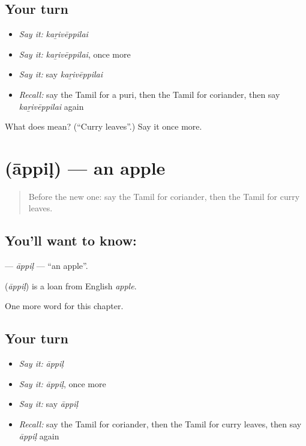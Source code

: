 \subsection*{Your turn}
\begin{itemize}
\raggedright
  \item \emph{Say it:} \emph{kaṟivēppilai}
  \item \emph{Say it:} \emph{kaṟivēppilai}, once more
  \item \emph{Say it:} say \emph{kaṟivēppilai}
  \item \emph{Recall:} say the Tamil for a puri, then the Tamil for coriander, then say \emph{kaṟivēppilai} again
\end{itemize}

\begin{tcolorbox}[breakable,colback=teal!4,colframe=teal!35!black,title={Before you move on}]
What does  mean? (\textquotedblleft{}Curry leaves\textquotedblright{}.) Say it once more.
\end{tcolorbox}
\section[\texorpdfstring{\ta{ஆப்பிள்} (āppiḷ)}{ஆப்பிள் (āppiḷ)}]{ (āppiḷ) — an apple}

\label{lesson:TA-C271-appil}



\begin{quote}
Before the new one: say the Tamil for coriander, then the Tamil for curry leaves.
\end{quote}

\subsection*{You'll want to know: }
\textbf{} — \emph{āppiḷ} — \textquotedblleft{}an apple\textquotedblright{}.

\begin{cousinweb}
\textbf{} (\emph{āppiḷ}) is a loan from English \emph{apple}.
\end{cousinweb}

\begin{grammarlens}[title={What you've built}]
One more word for this chapter.
\end{grammarlens}

\subsection*{Your turn}
\begin{itemize}
\raggedright
  \item \emph{Say it:} \emph{āppiḷ}
  \item \emph{Say it:} \emph{āppiḷ}, once more
  \item \emph{Say it:} say \emph{āppiḷ}
  \item \emph{Recall:} say the Tamil for coriander, then the Tamil for curry leaves, then say \emph{āppiḷ} again
\end{itemize}


